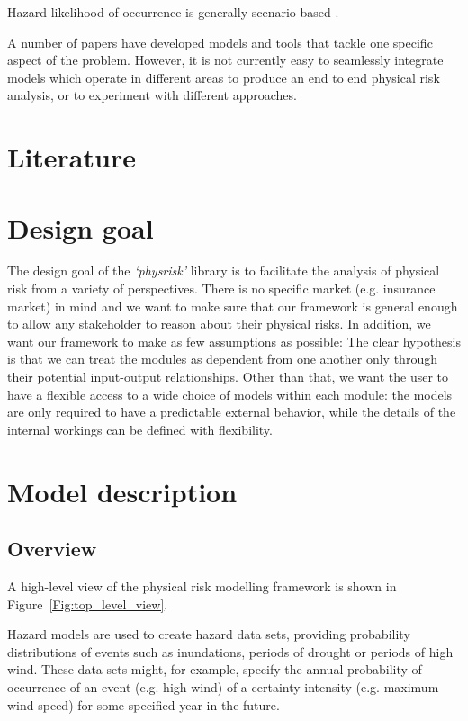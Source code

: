 \documentclass{article}
\begin{document}
Hazard likelihood of occurrence is generally scenario-based \cite{BertramEtAl:2020}. 

A number of papers have developed models and tools that tackle one specific aspect of the problem. However, it is not currently easy to seamlessly integrate models which operate in different areas to produce an end to end physical risk analysis, or to experiment with different approaches.


\section{Literature}

\section{Design goal}
The design goal of the \emph{`physrisk'} library is to facilitate the analysis of physical risk from a variety of perspectives. There is no specific market (e.g. insurance market) in mind and we want to make sure that our framework is general enough to allow any stakeholder to reason about their physical risks. In addition, we want our framework to make as few assumptions as possible: The clear hypothesis is that we can treat the modules as dependent from one another only through their potential input-output relationships. Other than that, we want the user to have a flexible access to a wide choice of models within each module: the models are only required to have a predictable external behavior, while the details of the internal workings can be defined with flexibility.

\section{Model description}

\subsection{Overview}
A high-level view of the physical risk modelling framework is shown in Figure~\ref{Fig:top_level_view}.

Hazard models are used to create hazard data sets, providing probability distributions of events such as inundations, periods of drought or periods of high wind. These data sets might, for example, specify the annual probability of occurrence of an event (e.g. high wind) of a certainty intensity (e.g. maximum wind speed) for some specified year in the future.
\end{document}
